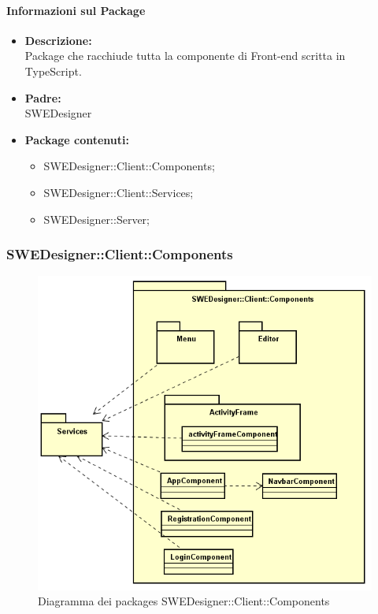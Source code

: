 		\paragraph{Informazioni sul Package}
		\begin{itemize}
			\item \textbf{Descrizione: }\\
			Package che racchiude tutta la componente di Front-end scritta in TypeScript.
			\item \textbf{Padre: }\\ SWEDesigner
			\item \textbf{Package contenuti: }
			\begin{itemize}
				\item SWEDesigner::Client::Components;
				\item SWEDesigner::Client::Services;
				\item SWEDesigner::Server;
			\end{itemize}
		\end{itemize}

		\subsubsection{SWEDesigner::Client::Components}
		 \begin{figure}[h!]
		\centering
		\includegraphics[scale=0.8]{Disegnetti/SWEDesigner__Client_Components.png}
		\caption{Diagramma dei packages SWEDesigner::Client::Components}
 		\end{figure}
